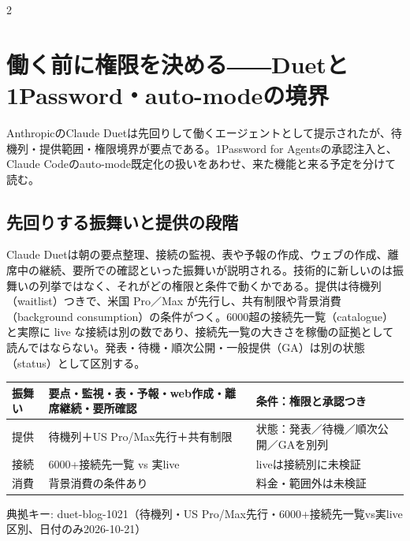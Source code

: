 \documentclass[lualatex,a4paper,10pt]{jlreq}
\begin{document}
\begin{multicols}{2} %


\section{働く前に権限を決める――Duetと1Password・auto-modeの境界}
\label{sec:P3}


AnthropicのClaude Duetは先回りして働くエージェントとして提示されたが、待機列・提供範囲・権限境界が要点である。1Password for Agentsの承認注入と、Claude Codeのauto-mode既定化の扱いをあわせ、来た機能と来る予定を分けて読む。


\subsection*{先回りする振舞いと提供の段階}


Claude Duetは朝の要点整理、接続の監視、表や予報の作成、ウェブの作成、離席中の継続、要所での確認といった振舞いが説明される。技術的に新しいのは振舞いの列挙ではなく、それがどの権限と条件で動くかである。提供は待機列（waitlist）つきで、米国 Pro／Max が先行し、共有制限や背景消費（background consumption）の条件がつく。6000超の接続先一覧（catalogue）と実際に live な接続は別の数であり、接続先一覧の大きさを稼働の証拠として読んではならない。発表・待機・順次公開・一般提供（GA）は別の状態（status）として区別する。


\end{multicols} %
{\centering\footnotesize
{}
\begin{tabularx}{0.96\linewidth}{@{}lXX@{}}
\toprule
振舞い & 要点・監視・表・予報・web作成・離席継続・要所確認 & 条件：権限と承認つき \\
\midrule
提供 & 待機列＋US Pro/Max先行＋共有制限 & 状態：発表／待機／順次公開／GAを別列 \\
接続 & 6000+接続先一覧 vs 実live & liveは接続別に未検証 \\
消費 & 背景消費の条件あり & 料金・範囲外は未検証 \\
\bottomrule
\end{tabularx}
{\scriptsize\color{SurveyMuted} 典拠キー: duet-blog-1021（待機列・US Pro/Max先行・6000+接続先一覧vs実live区別、日付のみ2026-10-21）\par}
} %
\end{document}
